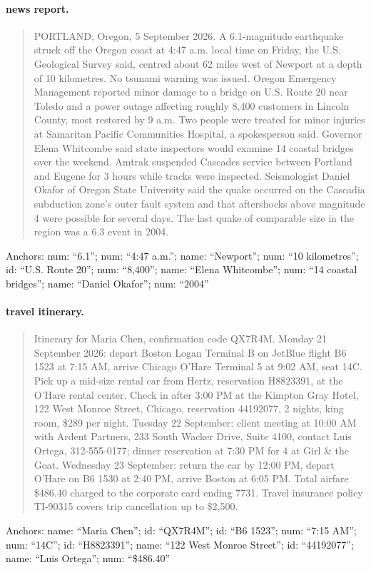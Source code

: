 \paragraph{news report.}
\begin{quote}\small PORTLAND, Oregon, 5 September 2026. A 6.1-magnitude earthquake struck off the Oregon coast at 4:47 a.m. local time on Friday, the U.S. Geological Survey said, centred about 62 miles west of Newport at a depth of 10 kilometres. No tsunami warning was issued. Oregon Emergency Management reported minor damage to a bridge on U.S. Route 20 near Toledo and a power outage affecting roughly 8,400 customers in Lincoln County, most restored by 9 a.m. Two people were treated for minor injuries at Samaritan Pacific Communities Hospital, a spokesperson said. Governor Elena Whitcombe said state inspectors would examine 14 coastal bridges over the weekend. Amtrak suspended Cascades service between Portland and Eugene for 3 hours while tracks were inspected. Seismologist Daniel Okafor of Oregon State University said the quake occurred on the Cascadia subduction zone's outer fault system and that aftershocks above magnitude 4 were possible for several days. The last quake of comparable size in the region was a 6.3 event in 2004.\end{quote}
\noindent\footnotesize Anchors: num: ``6.1''; num: ``4:47 a.m.''; name: ``Newport''; num: ``10 kilometres''; id: ``U.S. Route 20''; num: ``8,400''; name: ``Elena Whitcombe''; num: ``14 coastal bridges''; name: ``Daniel Okafor''; num: ``2004''\normalsize

\paragraph{travel itinerary.}
\begin{quote}\small Itinerary for Maria Chen, confirmation code QX7R4M. Monday 21 September 2026: depart Boston Logan Terminal B on JetBlue flight B6 1523 at 7:15 AM, arrive Chicago O'Hare Terminal 5 at 9:02 AM, seat 14C. Pick up a mid-size rental car from Hertz, reservation H8823391, at the O'Hare rental center. Check in after 3:00 PM at the Kimpton Gray Hotel, 122 West Monroe Street, Chicago, reservation 44192077, 2 nights, king room, \$289 per night. Tuesday 22 September: client meeting at 10:00 AM with Ardent Partners, 233 South Wacker Drive, Suite 4100, contact Luis Ortega, 312-555-0177; dinner reservation at 7:30 PM for 4 at Girl \& the Goat. Wednesday 23 September: return the car by 12:00 PM, depart O'Hare on B6 1530 at 2:40 PM, arrive Boston at 6:05 PM. Total airfare \$486.40 charged to the corporate card ending 7731. Travel insurance policy TI-90315 covers trip cancellation up to \$2,500.\end{quote}
\noindent\footnotesize Anchors: name: ``Maria Chen''; id: ``QX7R4M''; id: ``B6 1523''; num: ``7:15 AM''; num: ``14C''; id: ``H8823391''; name: ``122 West Monroe Street''; id: ``44192077''; name: ``Luis Ortega''; num: ``\$486.40''\normalsize

